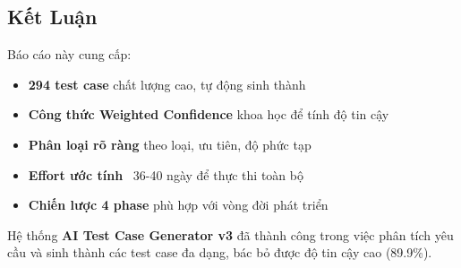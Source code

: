 \documentclass[12pt, a4paper]{article}
\begin{document}
\subsection{Kết Luận}

Báo cáo này cung cấp:
\begin{itemize}
    \item \textbf{294 test case} chất lượng cao, tự động sinh thành
    \item \textbf{Công thức Weighted Confidence} khoa học để tính độ tin cậy
    \item \textbf{Phân loại rõ ràng} theo loại, ưu tiên, độ phức tạp
    \item \textbf{Effort ước tính} ~36-40 ngày để thực thi toàn bộ
    \item \textbf{Chiến lược 4 phase} phù hợp với vòng đời phát triển
\end{itemize}

Hệ thống \textbf{AI Test Case Generator v3} đã thành công trong việc phân tích yêu cầu và sinh thành các test case đa dạng, bác bỏ được độ tin cậy cao (89.9\%).
\end{document}

